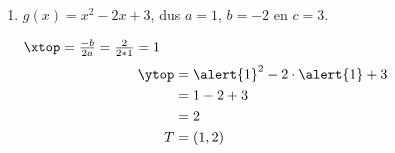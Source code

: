 


























\newpage
\begin{antwoord}{3}
\begin{enumerate}
\item $g(x) = x^2 - 2x +3$, dus $a = 1$, $b = -2$ en $c = 3$.

\medskip
$\xtop = \frac{-b}{2a} = \frac{2}{2 * 1} = 1 $
\begin{align*}
\ytop &= \alert{1}^2 - 2 \cdot \alert{1} + 3\\ 
&= 1 - 2 +3\\
&= 2\\
T &= (1, 2)
\end{align*}
% 
% 
\end{enumerate}
\end{antwoord}
